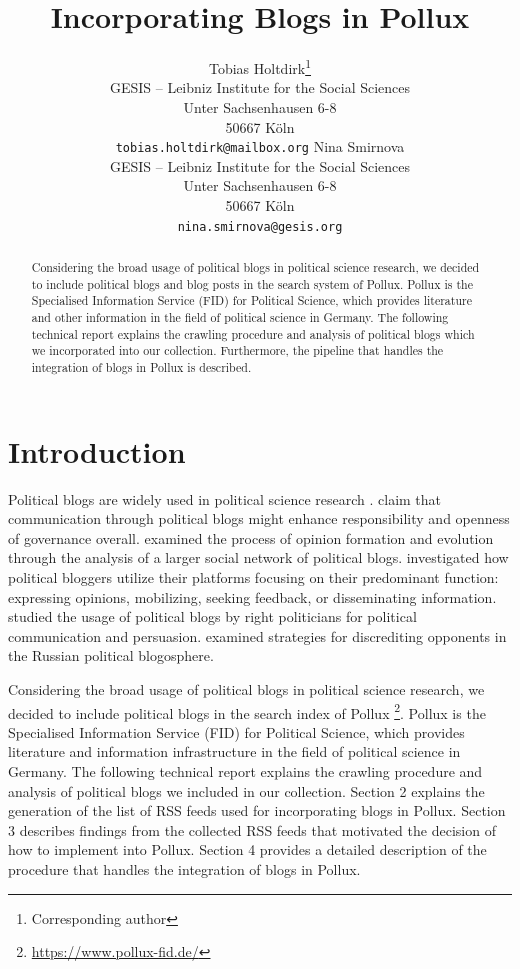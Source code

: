 \documentclass{article}
\title{Incorporating Blogs in Pollux}
\author{Tobias Holtdirk\thanks{Corresponding author}\\
	GESIS -- Leibniz Institute for the Social Sciences\\
	Unter Sachsenhausen 6-8 \\
    50667 Köln \\
	\texttt{tobias.holtdirk@mailbox.org}
    \And 
    Nina Smirnova\\
	GESIS -- Leibniz Institute for the Social Sciences\\
	Unter Sachsenhausen 6-8 \\
    50667 Köln \\
	\texttt{nina.smirnova@gesis.org}
}
\begin{document}
\maketitle

\begin{abstract}
	Considering the broad usage of political blogs in political science research, we decided to include political blogs and blog posts in the search system of Pollux. Pollux is the Specialised Information Service (FID) for Political Science, which provides literature and other information in the field of political science in Germany. The following technical report explains the crawling procedure and analysis of political blogs which we incorporated into our collection. Furthermore, the pipeline that handles the integration of blogs in Pollux is described.
\end{abstract}



\section{Introduction}
Political blogs are widely used in political science research \citep{wallsten_agenda_2007, coleman_political_2008, wallsten_political_2008, guner_political_2009, akinnubi_deliberative_2023, peng_role_2023}. \cite{coleman_political_2008} claim that communication through political blogs might enhance responsibility and openness of governance overall. \cite{peng_role_2023} examined the process of opinion formation and evolution through the analysis of a larger social network of political blogs. \cite{wallsten_political_2008} investigated how political bloggers utilize their platforms focusing on their predominant function: expressing opinions, mobilizing, seeking feedback, or disseminating information. \cite{demasi_analysing_2020} studied the usage of political blogs by right politicians for political communication and persuasion. \cite{balakhonskaya_communicative_2020} examined strategies for discrediting opponents in the Russian political blogosphere.

Considering the broad usage of political blogs in political science research, we decided to include political blogs in the search index of Pollux \footnote{\url{https://www.pollux-fid.de/}}. Pollux is the Specialised Information Service (FID) for Political Science, which provides literature and information infrastructure in the field of political science in Germany. The following technical report explains the crawling procedure and analysis of political blogs we included in our collection. Section 2 explains the generation of the list of RSS feeds used for incorporating blogs in Pollux. Section 3 describes findings from the collected RSS feeds that motivated the decision of how to implement into Pollux. Section 4 provides a detailed description of the procedure that handles the integration of blogs in Pollux.
\end{document}
